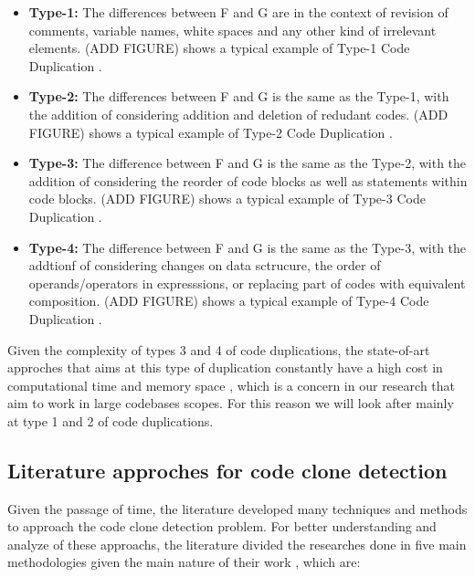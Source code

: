 \begin{itemize}
	\item \textbf{Type-1:} The differences between F and G are in the context of revision of comments, variable names, white spaces and any other kind of irrelevant elements. (ADD FIGURE) shows a typical example of Type-1 Code Duplication \citep{litreview}. 

	\item \textbf{Type-2:} The differences between F and G is the same as the Type-1, with the addition of considering addition and deletion of redudant codes. (ADD FIGURE) shows a typical example of Type-2 Code Duplication \citep{litreview}. 

	\item \textbf{Type-3:} The difference between F and G is the same as the Type-2, with the addition of considering the reorder of code blocks as well as statements within code blocks. (ADD FIGURE) shows a typical example of Type-3 Code Duplication \citep{litreview}. 

	\item \textbf{Type-4:} The difference between F and G is the same as the Type-3, with the addtionf of considering changes on data sctrucure, the order of operands/operators in expresssions, or replacing part of codes with equivalent composition. (ADD FIGURE) shows a typical example of Type-4 Code Duplication \citep{litreview}. 
\end{itemize}

Given the complexity of  types 3 and 4 of code duplications, the state-of-art approches that aims at this type of
duplication constantly have a high cost in computational time and memory space \citep{litreview}, which is a concern in our research 
that aim to work in large codebases scopes. For this reason we will look after mainly at type 1 and 2 of code duplications.

\subsection{Literature approches for code clone detection}

Given the passage of time, the literature developed many techniques and methods to approach the code clone detection problem. 
For better understanding and analyze of these approachs, the literature divided the researches done in
five main methodologies given the main nature of their work \citep{litreview} , which are:

